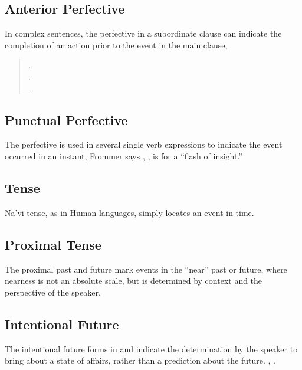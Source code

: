 \subsection{Anterior Perfective} In complex sentences, the perfective
in a subordinate clause can indicate the completion of an action prior
to the event in the main clause, 

\begin{quotation}
\noindent{}.\\
\indent{}.\\

\noindent{}.\\
\indent{}
\end{quotation}

\subsection{Punctual Perfective} The perfective is used in several
single verb expressions to indicate the event occurred in an instant,
   
Frommer says , , is for a ``flash of insight.''

\subsection{Tense} Na'vi tense, as in Human languages, simply locates
an event in time.


\subsection{Proximal Tense} The proximal past and future mark events
in the ``near'' past or future, where nearness is not an absolute
scale, but is determined by context and the perspective of the
speaker.

\subsection{Intentional Future} The intentional future forms in
 and  indicate the determination by the
speaker to bring about a state of affairs, rather than a prediction
about the future.   , 
.\label{syn:verb:intenfut}


